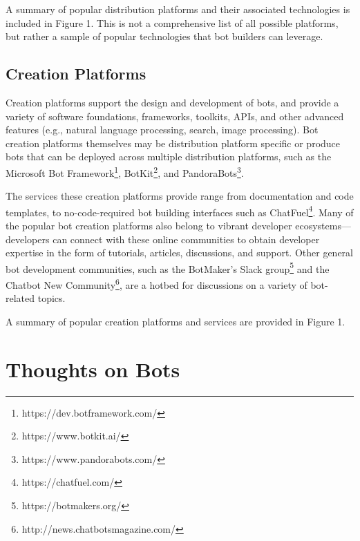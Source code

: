 \documentclass{sig-alternate}
\begin{document}
	A summary of popular distribution platforms and their associated technologies is included in Figure 1.  This is not a comprehensive list of all possible platforms, but rather a sample of popular technologies that bot builders can leverage.

	\subsection{Creation Platforms}

	Creation platforms support the design and development of bots, and provide a variety of software foundations, frameworks, toolkits, APIs, and other advanced features (e.g., natural language processing, search, image processing). Bot creation platforms themselves may be distribution platform specific or produce bots that can be deployed across multiple distribution platforms, such as the Microsoft Bot Framework\footnote{https://dev.botframework.com/}, BotKit\footnote{https://www.botkit.ai/}, and PandoraBots\footnote{https://www.pandorabots.com/}.
	
	The services these creation platforms provide range from documentation and code templates, to no-code-required bot building interfaces such as ChatFuel\footnote{https://chatfuel.com/}. 
	Many of the popular bot creation platforms also belong to vibrant developer ecosystems---developers can connect with these online communities to obtain developer expertise in the form of tutorials, articles, discussions, and support.  Other general bot development communities, such as the BotMaker's Slack group\footnote{https://botmakers.org/} and the Chatbot New Community\footnote{http://news.chatbotsmagazine.com/}, are a hotbed for discussions on a variety of bot-related topics.

	A summary of popular creation platforms and services are provided in Figure 1.


 \section{Thoughts on Bots}
	
\end{document}
